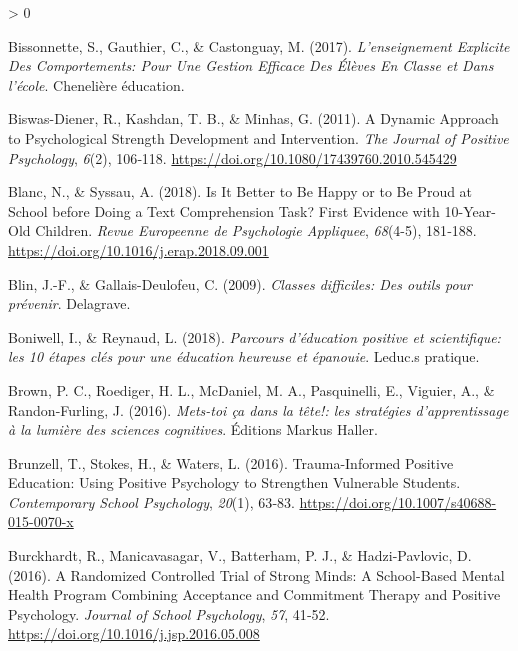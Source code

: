\documentclass[
  french,
]{article}
\newlength{\cslhangindent}
\newenvironment{CSLReferences}[2] %
 {%
  \setlength{\parindent}{0pt}
  \ifodd #1 \everypar{\setlength{\hangindent}{\cslhangindent}}\ignorespaces\fi
  \ifnum #2 > 0
  \setlength{\parskip}{#2\baselineskip}
  \fi
 }%
 {}
\begin{document}
\hypertarget{refs}{}
\begin{CSLReferences}{1}{0}
\leavevmode\hypertarget{ref-bissonnette2017}{}%
Bissonnette, S., Gauthier, C., \& Castonguay, M. (2017). \emph{L'enseignement Explicite Des Comportements: Pour Une Gestion Efficace Des Élèves En Classe et Dans l'école}. {Chenelière éducation}.

\leavevmode\hypertarget{ref-biswas-diener2011}{}%
Biswas-Diener, R., Kashdan, T. B., \& Minhas, G. (2011). A Dynamic Approach to Psychological Strength Development and Intervention. \emph{The Journal of Positive Psychology}, \emph{6}(2), 106‑118. \url{https://doi.org/10.1080/17439760.2010.545429}

\leavevmode\hypertarget{ref-blanc2018}{}%
Blanc, N., \& Syssau, A. (2018). Is It Better to Be Happy or to Be Proud at School before Doing a Text Comprehension Task? {First} Evidence with 10-Year-Old Children. \emph{Revue Europeenne de Psychologie Appliquee}, \emph{68}(4-5), 181‑188. \url{https://doi.org/10.1016/j.erap.2018.09.001}

\leavevmode\hypertarget{ref-blin2009}{}%
Blin, J.-F., \& Gallais-Deulofeu, C. (2009). \emph{{Classes difficiles: Des outils pour prévenir}}. {Delagrave}.

\leavevmode\hypertarget{ref-boniwell2018}{}%
Boniwell, I., \& Reynaud, L. (2018). \emph{{Parcours d'éducation positive et scientifique: les 10 étapes clés pour une éducation heureuse et épanouie}}. {Leduc.s pratique}.

\leavevmode\hypertarget{ref-brown2016}{}%
Brown, P. C., Roediger, H. L., McDaniel, M. A., Pasquinelli, E., Viguier, A., \& Randon-Furling, J. (2016). \emph{{Mets-toi ça dans la tête!: les stratégies d'apprentissage à la lumière des sciences cognitives}}. {Éditions Markus Haller}.

\leavevmode\hypertarget{ref-brunzell2016}{}%
Brunzell, T., Stokes, H., \& Waters, L. (2016). Trauma-{Informed Positive Education}: {Using Positive Psychology} to {Strengthen Vulnerable Students}. \emph{Contemporary School Psychology}, \emph{20}(1), 63‑83. \url{https://doi.org/10.1007/s40688-015-0070-x}

\leavevmode\hypertarget{ref-burckhardt2016}{}%
Burckhardt, R., Manicavasagar, V., Batterham, P. J., \& Hadzi-Pavlovic, D. (2016). A Randomized Controlled Trial of Strong Minds: {A} School-Based Mental Health Program Combining Acceptance and Commitment Therapy and Positive Psychology. \emph{Journal of School Psychology}, \emph{57}, 41‑52. \url{https://doi.org/10.1016/j.jsp.2016.05.008}


\end{CSLReferences}
\end{document}
